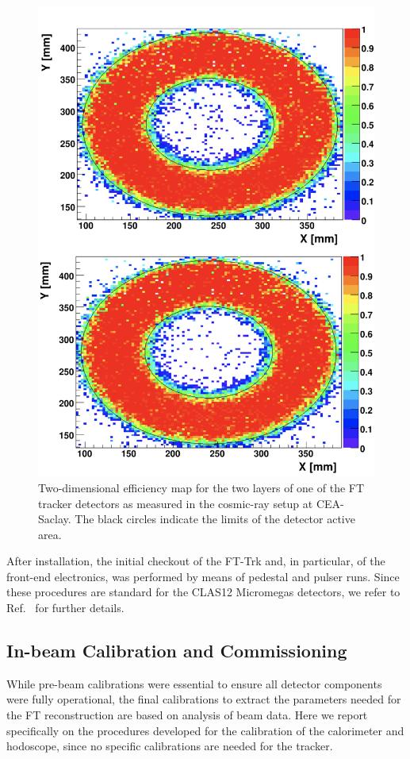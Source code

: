 \begin{figure}[htb]
 \includegraphics[width=0.9\columnwidth,keepaspectratio]{fig/fttrk_cosmic.png}
 \caption{Two-dimensional efficiency map for the two layers of one of the FT tracker detectors as measured in the
   cosmic-ray setup at CEA-Saclay. The black circles indicate the limits of the detector active area.}
 \label{fig:ftt_cosmic}
\end{figure}

After installation, the initial checkout of the FT-Trk and, in particular, of the front-end electronics, was performed
by means of pedestal and pulser runs. Since these procedures are standard for the CLAS12 Micromegas detectors,
we refer to Ref.~\cite{mm} for further details.

\subsection{In-beam Calibration and Commissioning}

While pre-beam calibrations were essential to ensure all detector components were fully operational, the final
calibrations to extract the parameters needed for the FT reconstruction are based on analysis of beam data.
Here we report specifically on the procedures developed for the calibration of the calorimeter and hodoscope,
since no specific calibrations are needed for the tracker.

